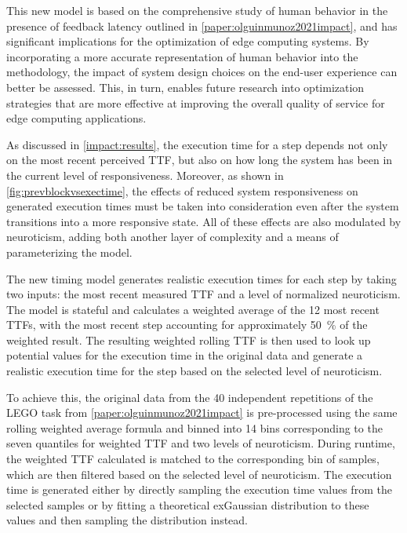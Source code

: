 This new model is based on the comprehensive study of human behavior in the presence of feedback latency outlined in \cref{paper:olguinmunoz2021impact}, and has significant implications for the optimization of edge computing systems.
By incorporating a more accurate representation of human behavior into the methodology, the impact of system design choices on the end-user experience can better be assessed.
This, in turn, enables future research into optimization strategies that are more effective at improving the overall quality of service for edge computing applications.

\medskip
As discussed in \cref{impact:results}, the execution time for a step depends not only on the most recent perceived \gls{TTF}, but also on how long the system has been in the current level of responsiveness.
Moreover, as shown in \cref{fig:prevblockvsexectime}, the effects of reduced system responsiveness on generated execution times must be taken into consideration even after the system transitions into a more responsive state.
All of these effects are also modulated by neuroticism, adding both another layer of complexity and a means of parameterizing the model.

The new timing model generates realistic execution times for each step by taking two inputs: the most recent measured \gls{TTF} and a level of normalized neuroticism.
The model is stateful and calculates a weighted average of the 12 most recent \glspl{TTF}, with the most recent step accounting for approximately \SI{50}{\percent} of the weighted result.
The resulting weighted rolling \gls{TTF} is then used to look up potential values for the execution time in the original data and generate a realistic execution time for the step based on the selected level of neuroticism.

To achieve this, the original data from the \num{40} independent repetitions of the LEGO task from \cref{paper:olguinmunoz2021impact} is pre-processed using the same rolling weighted average formula and binned into \num{14} bins corresponding to the seven quantiles for weighted TTF and two levels of neuroticism.
During runtime, the weighted \gls{TTF} calculated is matched to the corresponding bin of samples, which are then filtered based on the selected level of neuroticism.
The execution time is generated either by directly sampling the execution time values from the selected samples or by fitting a theoretical \gls{exGaussian} distribution to these values and then sampling the distribution instead.

